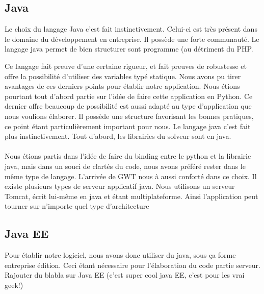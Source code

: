 
\subsection{Java}
Le choix du langage Java c'est fait instinctivement. Celui-ci est très présent dans le domaine du développement en entreprise. Il possède une forte communauté. Le langage java permet de bien structurer sont programme (au détriment du PHP. %

Ce langage fait preuve d'une certaine rigueur, et fait preuves de robustesse et offre la possibilité d'utiliser des variables typé statique. Nous avons pu tirer avantages de ces derniers points pour établir notre application.
Nous étions pourtant tout d'abord partie sur l'idée de faire cette application en Python. Ce dernier offre beaucoup de possibilité est aussi adapté au type d'application que nous voulions élaborer. Il possède une structure favorisant les bonnes pratiques, ce point étant particulièrement important pour nous. Le langage java c'est fait plus instinctivement. Tout d'abord, les librairies du solveur sont en java.\\
\\
Nous étions partis dans l'idée de faire du binding entre le python et la librairie java, mais dans un souci de clartés du code, nous avons préféré rester dans le même type de langage. L'arrivée de GWT nous à aussi conforté dans ce choix.
Il existe plusieurs types de serveur applicatif java. Nous utilisons un serveur Tomcat, écrit lui-même en java et étant multiplateforme. Ainsi l'application peut tourner sur n'importe quel type d'architecture


\subsection{Java EE}
Pour établir notre logiciel, nous avons donc utiliser du java, sous ça forme entreprise édition. Ceci étant nécessaire pour l'élaboration du code partie serveur. Rajouter du blabla sur Java EE (c'est super cool java EE, c'est pour les vrai geek!)

